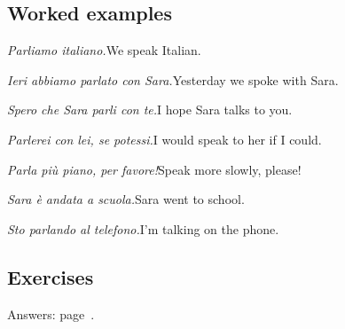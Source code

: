 \documentclass[11pt,a4paper,twoside,openright]{book}
\begin{document}
\subsection*{Worked examples}
\begin{examples}
\item\relax \textit{Parliamo italiano.}\newline We speak Italian.
\item\relax \textit{Ieri abbiamo parlato con Sara.}\newline Yesterday we spoke with Sara.
\item\relax \textit{Spero che Sara parli con te.}\newline I hope Sara talks to you.
\item\relax \textit{Parlerei con lei, se potessi.}\newline I would speak to her if I could.
\item\relax \textit{Parla più piano, per favore!}\newline Speak more slowly, please!
\item\relax \textit{Sara è andata a scuola.}\newline Sara went to school.
\item\relax \textit{Sto parlando al telefono.}\newline I'm talking on the phone.
\end{examples}

\subsection*{Exercises}\label{les:verb-system-overview:exercises}
{\color{muted}\small Answers: page~\pageref{ans:verb-system-overview}.}
\end{document}
